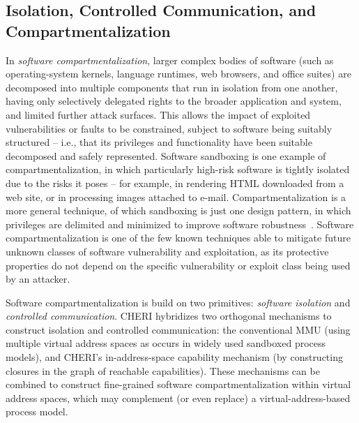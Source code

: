 \subsection{Isolation, Controlled Communication, and Compartmentalization}
\label{sec:model-isolation-controlled-communication-compartmentalization}

In \textit{software compartmentalization}, larger complex bodies of software
(such as operating-system kernels, language runtimes, web browsers, and office
suites) are decomposed into multiple components that run in isolation from one
another, having only selectively delegated rights to the broader application
and system, and limited further attack surfaces.
This allows the impact of exploited vulnerabilities or faults to be
constrained, subject to software being suitably structured -- i.e., that its
privileges and functionality have been suitable decomposed and safely
represented.
Software sandboxing is one example of compartmentalization, in which
particularly high-risk software is tightly isolated due to the risks it poses
-- for example, in rendering HTML downloaded from a web site, or in processing
images attached to e-mail.
Compartmentalization is a more general technique, of which sandboxing is just
one design pattern, in which privileges are delimited and minimized to improve
software
robustness~\cite{Karger87,provos:preventingprivesc,Watson10,gudka15:soaap}.
Software compartmentalization is one of the few known techniques able to
mitigate future unknown classes of software vulnerability and exploitation, as
its protective properties do not depend on the specific vulnerability or
exploit class being used by an attacker.

Software compartmentalization is build on two primitives: \textit{software
isolation} and \textit{controlled communication}.
CHERI hybridizes two orthogonal mechanisms to construct isolation and
controlled communication: the conventional MMU (using multiple virtual address
spaces as occurs in widely used sandboxed process models), and CHERI's
in-address-space capability mechanism (by constructing
closures  in the graph
of reachable capabilities).
These mechanisms can be combined to construct fine-grained software
compartmentalization within virtual address spaces, which may complement (or
even replace) a virtual-address-based process model.

